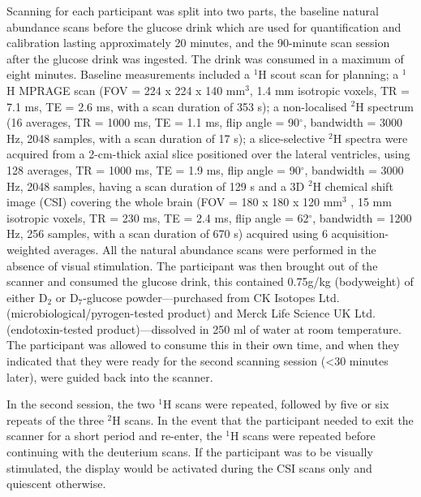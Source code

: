 \documentclass[class=article, crop=false]{standalone}
\begin{document}
Scanning for each participant was split into two parts, the baseline natural abundance scans before the glucose drink which are used for quantification and calibration lasting approximately 20 minutes, and the 90-minute scan session after the glucose drink was ingested. The drink was consumed in a maximum of eight minutes. Baseline measurements included a $^1$H scout scan for planning; a $^1$H MPRAGE scan (FOV = 224 x 224 x 140 mm$^3$, 1.4 mm isotropic voxels, TR = 7.1 ms, TE = 2.6 ms, with a scan duration of 353 s); a non-localised $^2$H spectrum (16 averages, TR = 1000 ms, TE = 1.1 ms, flip angle = 90$^\circ$, bandwidth = 3000 Hz, 2048 samples, with a scan duration of 17 s); a slice-selective $^2$H spectra were acquired from a 2-cm-thick axial slice positioned over the lateral ventricles, using 128 averages, TR = 1000 ms, TE = 1.9 ms, flip angle = 90$^\circ$, bandwidth = 3000 Hz,  2048 samples, having a scan duration of 129 s and a 3D $^2$H chemical shift image (CSI) covering the whole brain (FOV = 180 x 180 x 120 mm$^3$ , 15 mm isotropic voxels, TR = 230 ms, TE = 2.4 ms, flip angle = 62$^\circ$, bandwidth = 1200 Hz, 256 samples, with a scan duration of 670 s) acquired using 6 acquisition-weighted\cite{Pohmann2001AccurateCSI} averages. All the natural abundance scans were performed in the absence of visual stimulation. The participant was then brought out of the scanner and consumed the glucose drink, this contained 0.75g/kg (bodyweight) of either D$_2$ or D$_7$-glucose powder—purchased from CK Isotopes Ltd. (microbiological/pyrogen-tested product) and Merck Life Science UK Ltd. (endotoxin-tested product)—dissolved in 250 ml of water at room temperature. The participant was allowed to consume this in their own time, and when they indicated that they were ready for the second scanning session (<30 minutes later), were guided back into the scanner.


In the second session, the two $^1$H scans were repeated, followed by five or six repeats of the three $^2$H scans. In the event that the participant needed to exit the scanner for a short period and re-enter, the $^1$H scans were repeated before continuing with the deuterium scans. If the participant was to be visually stimulated, the display would be activated during the CSI scans only and quiescent otherwise.  
\end{document}
